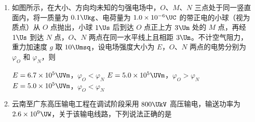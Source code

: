 \documentclass[\gkver]{gaokaozhenti}
\begin{document}
\begin{enumerate}
{故选 D。
}
\item
如图所示，在大小、方向均未知的匀强电场中，$ O $、$ M $、$ N $ 三点处于同一竖直面内，将一质量为 $ 0.1 \Ukg $、电荷量为 $ 1.0 \times 10 ^{-6} \UC $ 的带正电的小球（视为质点）从 $ O $ 点抛出，小球 $ 1 \Us $ 后到达 $ O $ 点正上方 $ 3 \Um $ 处的 $ M $ 点，再经 $ 1 \Us $ 到达 $ N $ 点，$ O $、$ N $ 两点在同一水平线上且相距 $ 3 \Um $。不计空气阻力，重力加速度 $ g $ 取 $ 10 \Umsq $，设电场强度大小为 $ E $，$ O $、$ N $ 两点的电势分别为 $ \varphi_{O} $ 和 $ \varphi_{N} $，则 
\onepicture[w=4.22cm]{}

{$ E =6.7 \times 10 ^{5} \UVm $，$\varphi_{O} < \varphi_{N}$}
{$ E =5.0 \times 10 ^{5} \UVm $，$\varphi_{O} > \varphi_{N}$}
{$ E =5.0 \times 10 ^{5} \UVm $，$\varphi_{O} < \varphi_{N}$}


\item
云南至广东高压输电工程在调试阶段采用 $ 800 \UkV $ 高压输电，输送功率为 $ 2.6 \times 10 ^{9} \UW $，关于该输电线路，下列说法正确的是 



\end{enumerate}
\end{document}
